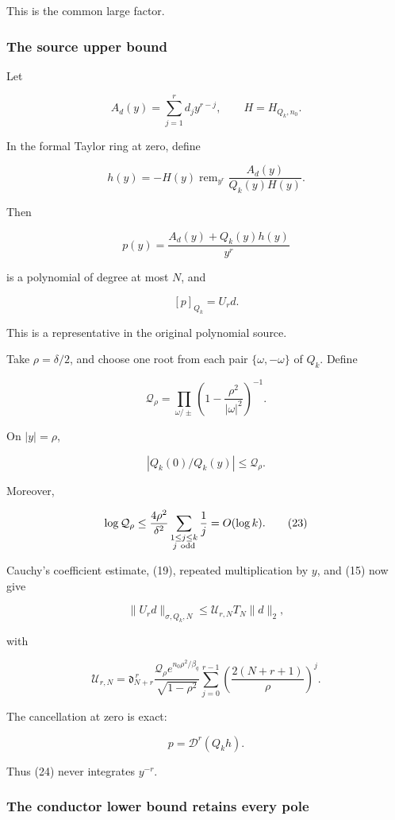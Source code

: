 \documentclass[11pt]{article}
\begin{document}
This is the common large factor.

\subsubsection{The source upper bound}\label{the-source-upper-bound}

Let

\[
A_d(y)=\sum_{j=1}^{r}d_jy^{r-j},
\qquad
H=H_{Q_k,n_0}.
\]

In the formal Taylor ring at zero, define

\[
h(y)=
-H(y)\operatorname{rem}_{y^r}
\frac{A_d(y)}{Q_k(y)H(y)}.
\]

Then

\[
p(y)=\frac{A_d(y)+Q_k(y)h(y)}{y^r}
\]

is a polynomial of degree at most \(N\), and

\[
[p]_{Q_k}=U_rd.
\]

This is a representative in the original polynomial source.

Take \(\rho=\delta/2\), and choose one root from each pair \(\{\omega,-\omega\}\) of \(Q_k\). Define

\[
\mathcal Q_\rho
=
\prod_{\omega/\pm}
\left(1-\frac{\rho^2}{|\omega|^2}\right)^{-1}.
\]

On \(|y|=\rho\),

\[
|Q_k(0)/Q_k(y)|\le\mathcal Q_\rho.
\]

Moreover,

\[
\log\mathcal Q_\rho
\le
\frac{4\rho^2}{\delta^2}
\sum_{\substack{1\le j\le k\\j\ {\rm odd}}}\frac1j
=O(\log k).
\tag{23}
\]

Cauchy's coefficient estimate, (19), repeated multiplication by \(y\), and (15) now give

\[
\boxed{
\|U_rd\|_{\sigma,Q_k,N}
\le \mathcal U_{r,N}T_N\|d\|_2,
}
\tag{24}
\]

with

\[
\boxed{
\mathcal U_{r,N}
=
\mathfrak d_{N+r}^{\,r}
\frac{\mathcal Q_\rho e^{n_0\rho^2/\beta_q}}
{\sqrt{1-\rho^2}}
\sum_{j=0}^{r-1}
\left(\frac{2(N+r+1)}{\rho}\right)^j.
}
\tag{25}
\]

The cancellation at zero is exact:

\[
p=\mathscr D^r(Q_kh).
\]

Thus (24) never integrates \(y^{-r}\).

\subsubsection{The conductor lower bound retains every pole}\label{the-conductor-lower-bound-retains-every-pole}
\end{document}
